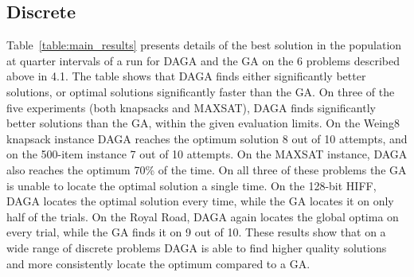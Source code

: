 \documentclass[runningheads,a4paper]{llncs}
\begin{document}
\subsection{Discrete}
Table~\ref{table:main_results} presents details of the best solution in the population at quarter intervals of a run for DAGA and the GA on the 6 problems described above in 4.1. The table shows that DAGA finds either significantly better solutions, or optimal solutions significantly faster than the GA. On three of the five experiments (both knapsacks and MAXSAT), DAGA finds significantly better solutions than the GA, within the given evaluation limits. On the Weing8 knapsack instance DAGA reaches the optimum solution 8 out of 10 attempts, and on the 500-item instance 7 out of 10 attempts. On the MAXSAT instance, DAGA also reaches the optimum 70\% of the time. On all three of these problems the GA is unable to locate the optimal solution a single time. On the 128-bit HIFF, DAGA locates the optimal solution every time, while the GA locates it on only half of the trials. On the Royal Road, DAGA again locates the global optima on every trial, while the GA finds it on 9 out of 10. These results show that on a wide range of discrete problems DAGA is able to find higher quality solutions and more consistently locate the optimum compared to a GA.
\end{document}
